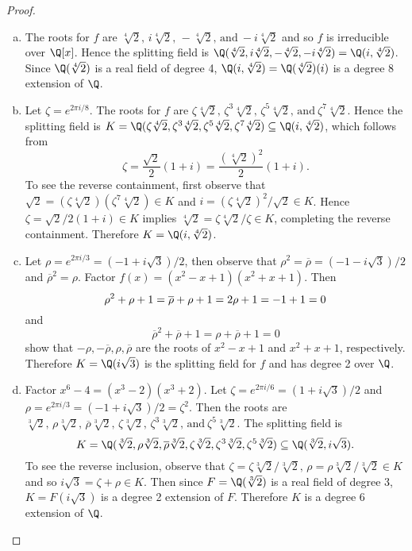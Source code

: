 \documentclass[10pt]{amsart}
\begin{document}
\begin{thm}
  \begin{proof}
    \begin{enumerate}[(a)]
    \item
      The roots for $f$ are $\sqrt[4]{2},\, i\sqrt[4]{2},\, -\sqrt[4]{2},\, \text{and}\ -i\sqrt[4]{2}$ and so $f$ is irreducible over $\Q[x]$.
      Hence the splitting field is $\Q(\sqrt[4]{2}, i\sqrt[4]{2}, -\sqrt[4]{2}, -i\sqrt[4]{2}) = \Q(i,\sqrt[4]{2})$.
      Since $\Q(\sqrt[4]{2})$ is a real field of degree 4, $\Q(i,\sqrt[4]{2}) = \Q(\sqrt[4]{2})(i)$ is a degree 8 extension of $\Q$.
    \item
      Let $\zeta = e^{2\pi i/8}$.
      The roots for $f$ are $\zeta\sqrt[4]{2},\, \zeta^3\sqrt[4]{2},\, \zeta^5\sqrt[4]{2},\, \text{and}\ \zeta^7\sqrt[4]{2}$.
      Hence the splitting field is $K = \Q(\zeta\sqrt[4]{2}, \zeta^3\sqrt[4]{2}, \zeta^5\sqrt[4]{2},\zeta^7\sqrt[4]{2}) \subseteq \Q(i,\sqrt[4]{2})$, which follows from $$\zeta = \frac{\sqrt{2}}{2}(1 + i) = \frac{(\sqrt[4]{2})^2}{2}(1 + i).$$
      To see the reverse containment, first observe that $\sqrt{2} = (\zeta\sqrt[4]{2})(\zeta^7\sqrt[4]{2}) \in K$ and $i = (\zeta\sqrt[4]{2})^2/\sqrt{2} \in K$.
      Hence $\zeta = \sqrt{2}/2(1 + i) \in K$ implies $\sqrt[4]{2} = \zeta\sqrt[4]{2}/\zeta \in K$, completing the reverse containment.
      Therefore $K = \Q(i, \sqrt[4]{2})$.
    \item
      Let $\rho = e^{2\pi i/3} = (-1 + i\sqrt{3})/2$, then observe that $\rho^2 = \overline{\rho} = (-1 - i\sqrt{3})/2$ and $\overline{\rho}^2 = \rho$.
      Factor $f(x) = (x^2 - x + 1)(x^2 + x + 1)$.
      Then $$\rho^2 + \rho + 1 = \overline{\rho} + \rho + 1 = 2\real{\rho} + 1 = -1 + 1 = 0$$ and $$\overline{\rho}^2 + \overline{\rho} + 1 = \rho + \overline{\rho} + 1 = 0$$
      show that $-\rho, -\overline{\rho}, \rho, \overline{\rho}$ are the roots of $x^2 - x + 1$ and $x^2 + x + 1$, respectively.
      Therefore $K = \Q(i\sqrt{3})$ is the splitting field for $f$ and has degree 2 over $\Q$.
    \item
      Factor $x^6 - 4 = {\left(x^{3} - 2\right)} {\left(x^{3} + 2\right)}$.
      Let $\zeta = e^{2\pi i/6} = (1 + i\sqrt{3})/2$ and $\rho = e^{2\pi i/3} = (-1 + i\sqrt{3})/2 = \zeta^2$.
      Then the roots are $\sqrt[3]{2},\, \rho\sqrt[3]{2},\, \overline{\rho}\sqrt[3]{2},\, \zeta\sqrt[3]{2},\, \zeta^3\sqrt[3]{2},\, \text{and}\ \zeta^5\sqrt[3]{2}$.
      The splitting field is 
      $$K = \Q(\sqrt[3]{2}, \rho\sqrt[3]{2}, \overline{\rho}\sqrt[3]{2}, \zeta\sqrt[3]{2}, \zeta^3\sqrt[3]{2}, \zeta^5\sqrt[3]{2}) \subseteq \Q(\sqrt[3]{2}, i\sqrt{3}).$$
      To see the reverse inclusion, observe that $\zeta = \zeta\sqrt[3]{2}/\sqrt[3]{2},\, \rho = \rho\sqrt[3]{2}/\sqrt[3]{2}\in K$ and so $i\sqrt{3} = \zeta + \rho \in K$.
      Then since $F = \Q(\sqrt[3]{2})$ is a real field of degree 3, $K = F(i\sqrt{3})$ is a degree 2 extension of $F$.
      Therefore $K$ is a degree 6 extension of $\Q$.
    \end{enumerate}
  \end{proof}
\end{thm}
\end{document}
